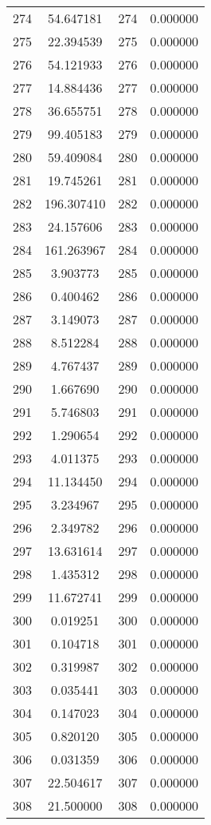\documentclass[12pt]{article}
\begin{document}
\begin{longtable}{@{}cccc@{}}
274 & 54.647181 & 274 & 0.000000 \\
275 & 22.394539 & 275 & 0.000000 \\
276 & 54.121933 & 276 & 0.000000 \\
277 & 14.884436 & 277 & 0.000000 \\
278 & 36.655751 & 278 & 0.000000 \\
279 & 99.405183 & 279 & 0.000000 \\
280 & 59.409084 & 280 & 0.000000 \\
281 & 19.745261 & 281 & 0.000000 \\
282 & 196.307410 & 282 & 0.000000 \\
283 & 24.157606 & 283 & 0.000000 \\
284 & 161.263967 & 284 & 0.000000 \\
285 & 3.903773 & 285 & 0.000000 \\
286 & 0.400462 & 286 & 0.000000 \\
287 & 3.149073 & 287 & 0.000000 \\
288 & 8.512284 & 288 & 0.000000 \\
289 & 4.767437 & 289 & 0.000000 \\
290 & 1.667690 & 290 & 0.000000 \\
291 & 5.746803 & 291 & 0.000000 \\
292 & 1.290654 & 292 & 0.000000 \\
293 & 4.011375 & 293 & 0.000000 \\
294 & 11.134450 & 294 & 0.000000 \\
295 & 3.234967 & 295 & 0.000000 \\
296 & 2.349782 & 296 & 0.000000 \\
297 & 13.631614 & 297 & 0.000000 \\
298 & 1.435312 & 298 & 0.000000 \\
299 & 11.672741 & 299 & 0.000000 \\
300 & 0.019251 & 300 & 0.000000 \\
301 & 0.104718 & 301 & 0.000000 \\
302 & 0.319987 & 302 & 0.000000 \\
303 & 0.035441 & 303 & 0.000000 \\
304 & 0.147023 & 304 & 0.000000 \\
305 & 0.820120 & 305 & 0.000000 \\
306 & 0.031359 & 306 & 0.000000 \\
307 & 22.504617 & 307 & 0.000000 \\
308 & 21.500000 & 308 & 0.000000 \\

\end{longtable}
\end{document}
